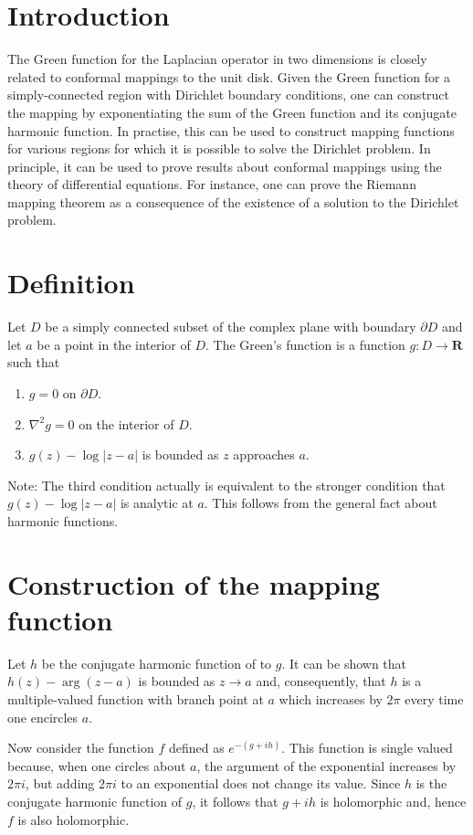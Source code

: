 \documentclass[12pt]{article}
\begin{document}
\section{Introduction}

The Green function for the Laplacian operator in two dimensions is closely related to conformal mappings to the unit disk.  Given the Green function for a simply-connected region with Dirichlet boundary conditions, one can construct the mapping by exponentiating the sum of the Green function and its conjugate harmonic function.  In practise, this can be used to construct mapping functions for various regions for which it is possible to solve the Dirichlet problem.  In principle, it can be used to prove results about conformal mappings using the theory of differential equations.  For instance, one can prove the Riemann mapping theorem as a consequence of the existence of a solution to the Dirichlet problem.

\section{Definition}

Let $D$ be a simply connected subset of the complex plane with boundary $\partial D$ and let $a$ be a point in the interior of $D$.  The Green's function is a function $g \colon D \to \mathbf{R}$ such that 
\begin{enumerate}
\item $g = 0$ on $\partial D$.
\item $\nabla^2 g = 0$ on the interior of $D$.
\item $g(z) - \log |z - a|$ is bounded as $z$ approaches $a$.
\end{enumerate}

Note: The third condition actually is equivalent to the stronger condition that $g(z) - \log |z-a|$ is analytic at $a$.  This follows from the general fact about harmonic functions.

\section{Construction of the mapping function}

Let $h$ be the conjugate harmonic function of to $g$.  It can be shown that $h(z) - \arg (z-a)$ is bounded as $z \to a$ and, consequently, that $h$ is a multiple-valued function with branch point at $a$ which increases by $2 \pi$ every time one encircles $a$.

Now consider the function $f$ defined as $e^{-(g + ih)}$.  This function is single valued because, when one circles about $a$, the argument of the exponential increases by $2 \pi i$, but adding $2 \pi i$ to an exponential does not change its value.  Since $h$ is the conjugate harmonic function of $g$, it follows that $g + ih$ is holomorphic and, hence $f$ is also holomorphic.
\end{document}
